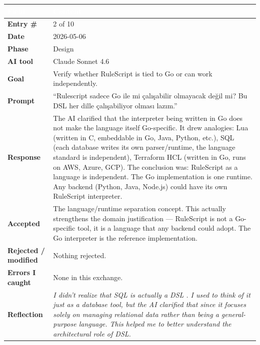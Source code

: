 \documentclass[a4paper,10pt]{article}
\begin{document}
\begin{tabular}{|
    >{\bfseries}m{3.5cm}|
    m{10cm}|
}
\hline
\rowcolor{headerblue}
\textcolor{white}{Field} & \textcolor{white}{\textbf{Content}} \\
\hline
\rowcolor{white}
Entry \#        & 2 of 10 \\
\hline
\rowcolor{altrow}
Date            & 2026-05-06 \\
\hline
\rowcolor{white}
Phase           & Design \\
\hline
\rowcolor{altrow}
AI tool         & Claude Sonnet 4.6  \\
\hline
\rowcolor{white}
Goal            & Verify whether RuleScript is tied to Go or can work independently. \\
\hline
\rowcolor{altrow}
Prompt          & ``Rulescript sadece Go ile mi çalışabilir olmayacak değil mi? Bu DSL her dille çalışabiliyor olması lazım.'' \\
\hline
\rowcolor{white}
Response  & The AI clarified that the interpreter being written in Go does not make the language itself Go-specific. It drew analogies: Lua (written in C, embeddable in Go, Java, Python, etc.), SQL (each database writes its own parser/runtime, the language standard is independent), Terraform HCL (written in Go, runs on AWS, Azure, GCP). The conclusion was: RuleScript as a language is independent. The Go implementation is one runtime. Any backend (Python, Java, Node.js) could have its own RuleScript interpreter. \\
\hline
\rowcolor{altrow}
Accepted        & The language/runtime separation concept. This actually strengthens the domain justification --- RuleScript is not a Go-specific tool, it is a language that any backend could adopt. The Go interpreter is the reference implementation. \\
\hline
\rowcolor{white}
Rejected / modified & Nothing rejected. \\
\hline
\rowcolor{altrow}
Errors I caught   & None in this exchange. \\
\hline
\rowcolor{white}
Reflection & \textit{I didn't realize that SQL is actually a DSL . I used to think of it just as a database tool, but the AI clarified that since it focuses solely on managing relational data rather than being a general-purpose language. This helped me to better understand the architectural role of  DSL.} \\
\hline
\end{tabular}

\newpage
\end{document}
